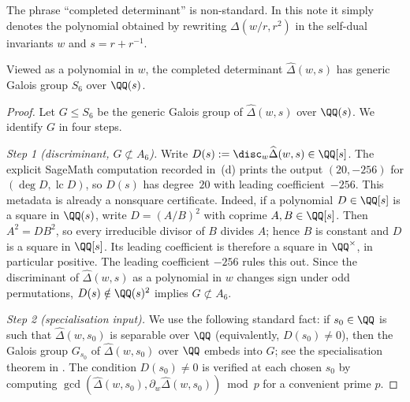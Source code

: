 \begin{remark}
The phrase ``completed determinant'' is non-standard. In this note it
simply denotes the polynomial obtained by rewriting \(\Delta(w/r,r^2)\)
in the self-dual invariants \(w\) and \(s=r+r^{-1}\).
\end{remark}



\begin{proposition}
  \label{prop:sync-hatdelta-galois-s6-generic}
  Viewed as a polynomial in \(w\), the completed determinant
  \(\widehat\Delta(w,s)\) has generic Galois group \(S_6\) over
  \(\QQ(s)\).
\end{proposition}

\begin{proof}

Let \(G\le S_6\) be the generic Galois group of
\(\widehat\Delta(w,s)\) over \(\QQ(s)\). We identify \(G\) in four
steps.

\medskip
\noindent\textit{Step 1 (discriminant, \(G\not\subset A_6\)).}\quad
Write \(D(s):=\disc_w\widehat\Delta(w,s)\in\QQ[s]\). The explicit
SageMath computation recorded in
\,(d) prints the output
\((20,-256)\) for \((\deg D,\operatorname{lc}D)\), so \(D(s)\) has
degree~\(20\) with leading coefficient~\(-256\).
This metadata is already a nonsquare certificate. Indeed, if a
polynomial \(D\in\QQ[s]\) is a square in \(\QQ(s)\), write
\(D=(A/B)^2\) with coprime \(A,B\in\QQ[s]\). Then
\(A^2=DB^2\), so every irreducible divisor of \(B\) divides \(A\);
hence \(B\) is constant and \(D\) is a square in \(\QQ[s]\). Its
leading coefficient is therefore a square in \(\QQ^\times\), in
particular positive. The leading coefficient \(-256\) rules this out.
Since the discriminant of \(\widehat\Delta(w,s)\) as a polynomial in
\(w\) changes sign under odd permutations,
\(D(s)\notin \QQ(s)^2\) implies \(G\not\subset A_6\).

\medskip
\noindent\textit{Step 2 (specialisation input).}\quad
We use the following standard fact: if \(s_0\in\QQ\) is such that
\(\widehat\Delta(w,s_0)\) is separable over \(\QQ\) (equivalently,
\(D(s_0)\neq 0\)), then the Galois group \(G_{s_0}\) of
\(\widehat\Delta(w,s_0)\) over \(\QQ\) embeds into \(G\); see the
specialisation theorem in \cite[\S 4.4, Proposition~1]{Serre2008Topics}.
The condition \(D(s_0)\neq 0\) is
verified at each chosen \(s_0\) by computing
\(\gcd(\widehat\Delta(w,s_0),\partial_w\widehat\Delta(w,s_0))\bmod p\)
for a convenient prime \(p\).


\end{proof}
